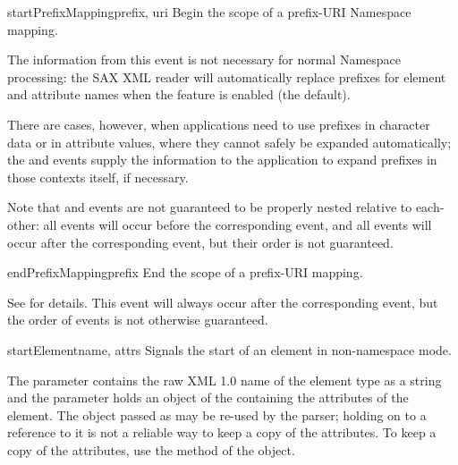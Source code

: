 \begin{methoddesc}[ContentHandler]{startPrefixMapping}{prefix, uri}
  Begin the scope of a prefix-URI Namespace mapping.
        
  The information from this event is not necessary for normal
  Namespace processing: the SAX XML reader will automatically replace
  prefixes for element and attribute names when the
   feature is enabled (the default).

  
  There are cases, however, when applications need to use prefixes in
  character data or in attribute values, where they cannot safely be
  expanded automatically; the  and
   events supply the information to the
  application to expand prefixes in those contexts itself, if
  necessary.
  
  Note that  and
   events are not guaranteed to be properly
  nested relative to each-other: all 
  events will occur before the corresponding 
  event, and all  events will occur after
  the corresponding  event, but their order is
  not guaranteed.
\end{methoddesc}

\begin{methoddesc}[ContentHandler]{endPrefixMapping}{prefix}
  End the scope of a prefix-URI mapping.

  See  for details. This event will
  always occur after the corresponding  event,
  but the order of  events is not otherwise
  guaranteed.
\end{methoddesc}

\begin{methoddesc}[ContentHandler]{startElement}{name, attrs}
  Signals the start of an element in non-namespace mode.

  The  parameter contains the raw XML 1.0 name of the
  element type as a string and the  parameter holds an
  object of the  containing the attributes of the
  element.  The object passed as  may be re-used by the
  parser; holding on to a reference to it is not a reliable way to
  keep a copy of the attributes.  To keep a copy of the attributes,
  use the  method of the  object.
\end{methoddesc}

